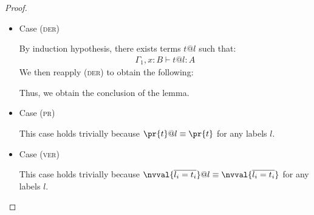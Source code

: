 \begin{proof}
\begin{itemize}
\item Case (\textsc{der})
\begin{center}
    \begin{minipage}{.45\linewidth}
    \end{minipage}
\end{center}
By induction hypothesis, there exists terms $t@l$ such that:
\begin{align*}
\Gamma_1, x:B \vdash t@l : A
\end{align*}
We then reapply (\textsc{der}) to obtain the following:
\begin{center}
    \begin{minipage}{.45\linewidth}
    \end{minipage}
\end{center}
Thus, we obtain the conclusion of the lemma.
\\

\item Case (\textsc{pr})
\begin{center}
    \begin{minipage}{.45\linewidth}
    \end{minipage}
\end{center}
This case holds trivially  because $\pr{t}@l \equiv \pr{t}$ for any labels $l$.
\\

\item Case (\textsc{ver})
\begin{center}
    \begin{minipage}{.65\linewidth}
    \end{minipage}
\end{center}
This case holds trivially because $\nvval{\overline{l_i=t_i}}@l\equiv \nvval{\overline{l_i=t_i}}$ for any labels $l$.
\\


\end{itemize}
\end{proof}
